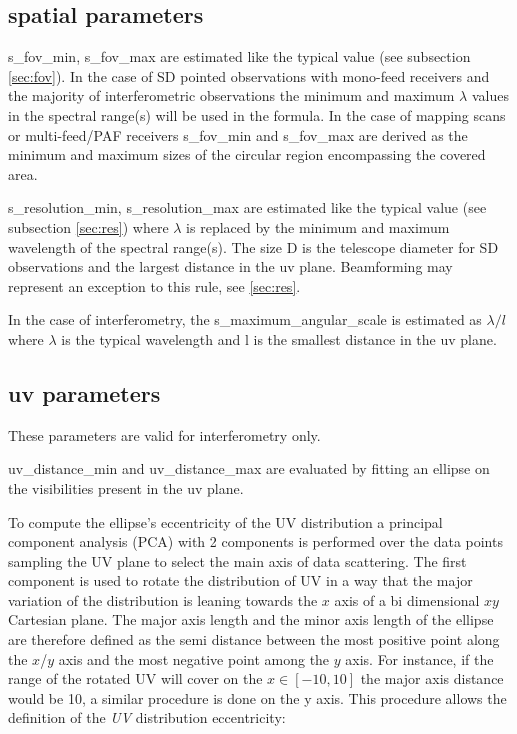 \documentclass[11pt,a4paper]{ivoa}
\begin{document}
\subsection{spatial parameters}
s\_fov\_min, s\_fov\_max are estimated like the typical value (see subsection \ref{sec:fov}). 
In the case of SD pointed observations with mono-feed receivers and the majority of interferometric observations the minimum and maximum $\lambda$ values in the spectral range(s) will be used in the formula. In the case of mapping scans or multi-feed/PAF receivers s\_fov\_min and s\_fov\_max are derived as the minimum and maximum sizes of the circular region encompassing the covered area.

s\_resolution\_min, s\_resolution\_max are estimated like the typical value (see subsection \ref{sec:res}) where $\lambda$ is replaced by the minimum and maximum wavelength of the spectral range(s). The size D is the telescope diameter for SD observations and the largest distance in the uv plane. Beamforming may represent an exception to this rule, see \ref{sec:res}.

In the case of interferometry, the s\_maximum\_angular\_scale is estimated as $\lambda/l$ where $\lambda$ is the typical 
wavelength and l is the smallest distance in the uv plane. 

\subsection{uv parameters}
These parameters are valid for interferometry only.

uv\_distance\_min and uv\_distance\_max are evaluated by fitting an ellipse on the 
visibilities present in the uv plane.

To compute the ellipse's eccentricity of the UV distribution a principal component analysis 
(PCA) with 2 components is performed over the data points sampling the UV plane to select the 
main axis of data scattering. 
The first component is used to rotate the distribution of UV in a way that the major variation 
of the distribution is leaning towards the $x$ axis of a bi dimensional $xy$ Cartesian plane. 
The major axis length and the minor axis length of the ellipse are therefore defined as the 
semi distance between the most positive point along the $x$/$y$ axis and the most negative point 
among the $y$ axis. For instance, if the range of the rotated UV will cover on the $x \in [-10, 
10]$ the major axis distance would be 10, a similar procedure is done on the y axis. This 
procedure allows the definition of the \emph{UV} distribution eccentricity:
\end{document}
